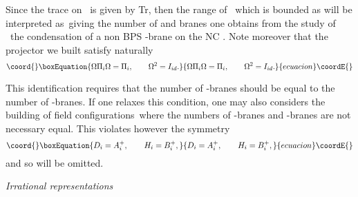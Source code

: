 \documentclass[a4paper,12pt]{article}
\begin{document}
Since the trace on \coordHE{}\ is given by Tr\coordHE{}, then the range of \coordHE{}\ which is bounded as
\coordHE{} will be interpreted as\ giving the number
of \coordHE{} and \coordHE{} branes  one obtains from the study of
\ the condensation of a non BPS \coordHE{}-brane on the NC
\coordHE{}. Note moreover that the
\coordHE{} projector we built satisfy naturally
\begin{equation}\coord{}\boxEquation{\label{identification}
\Omega \Pi _{i}\Omega =\Pi _{i},\qquad \Omega ^{2}=I_{id}.
}{\Omega \Pi _{i}\Omega =\Pi _{i},\qquad \Omega ^{2}=I_{id}.
}{ecuacion}\coordE{}\end{equation}

This identification requires that the number of \coordHE{}-branes should be equal
to the number of \coordHE{}-branes. If one relaxes this condition, one
may also considers the building of field configurations\  where
the numbers of \coordHE{}-branes and \coordHE{}-branes are not necessary
equal. This violates however the \coordHE{} symmetry
\begin{equation}\coord{}\boxEquation{\label{hermitic}
D_{i}=A_{i}^{+},\qquad H_{i}=B_{i}^{+},
}{D_{i}=A_{i}^{+},\qquad H_{i}=B_{i}^{+},
}{ecuacion}\coordE{}\end{equation}
and so will be omitted.

\bigskip

\textit{Irrational representations}
\end{document}
